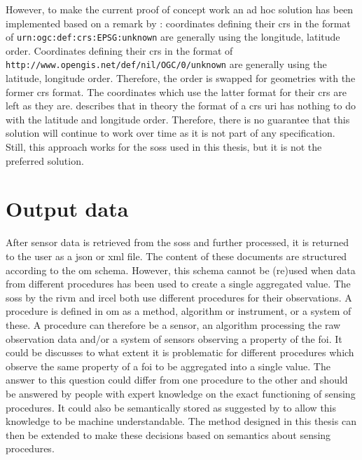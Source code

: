 However, to make the current proof of concept work an ad hoc solution has been implemented based on a remark by \cite{GEO:GDAL}: coordinates defining their \ac{crs} in the format of \texttt{urn:ogc:def:crs:EPSG:unknown} are generally using the longitude, latitude order. Coordinates defining their \ac{crs} in the format of \texttt{http://www.opengis.net/def/nil/OGC/0/unknown} are generally using the latitude, longitude order. Therefore, the order is swapped for geometries with the former \ac{crs} format. The coordinates which use the latter format for their \ac{crs} are left as they are. \cite{GEO:TOOLS} describes that in theory the format of a \ac{crs} \ac{uri} has nothing to do with the latitude and longitude order. Therefore, there is no guarantee that this solution will continue to work over time as it is not part of any specification. Still, this approach works for the \aclp{sos} used in this thesis, but it is not the preferred solution.   

\section{Output data}
After sensor data is retrieved from the \aclp{sos} and further processed, it is returned to the user as a \ac{json} or \ac{xml} file. The content of these documents are structured according to the \ac{om} schema. However, this schema cannot be (re)used when data from different procedures has been used to create a single aggregated value. The \aclp{sos} by the \ac{rivm} and \ac{ircel} both use different procedures for their observations. A procedure is defined in \ac{om} as a method, algorithm or instrument, or a system of these. A procedure can therefore be a sensor, an algorithm processing the raw observation data and/or a system of sensors observing a property of the \ac{foi}. It could be discusses to what extent it is problematic for different procedures which observe the same property of a \ac{foi} to be aggregated into a single value. The answer to this question could differ from one procedure to the other and should be answered by people with expert knowledge on the exact functioning of sensing procedures. It could also be semantically stored as suggested by \cite{SSW:Stasch4} to allow this knowledge to be machine understandable. The method designed in this thesis can then be extended to make these decisions based on semantics about sensing procedures. 

